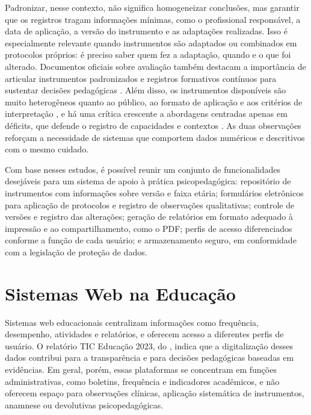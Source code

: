 Padronizar, nesse contexto, não significa homogeneizar conclusões, mas garantir que os registros tragam informações mínimas, como o profissional responsável, a data de aplicação, a versão do instrumento e as adaptações realizadas. Isso é especialmente relevante quando instrumentos são adaptados ou combinados em protocolos próprios: é preciso saber quem fez a adaptação, quando e o que foi alterado. Documentos oficiais sobre avaliação também destacam a importância de articular instrumentos padronizados e registros formativos contínuos para sustentar decisões pedagógicas \cite{mec2021_guia_avaliacao}. Além disso, os instrumentos disponíveis são muito heterogêneos quanto ao público, ao formato de aplicação e aos critérios de interpretação \cite{tavares2022_instrumentos_psicopedagogicos}, e há uma crítica crescente a abordagens centradas apenas em déficits, que defende o registro de capacidades e contextos \cite{Barbosa_2025}. As duas observações reforçam a necessidade de sistemas que comportem dados numéricos e descritivos com o mesmo cuidado.

Com base nesses estudos, é possível reunir um conjunto de funcionalidades desejáveis para um sistema de apoio à prática psicopedagógica: repositório de instrumentos com informações sobre versão e faixa etária; formulários eletrônicos para aplicação de protocolos e registro de observações qualitativas; controle de versões e registro das alterações; geração de relatórios em formato adequado à impressão e ao compartilhamento, como o PDF; perfis de acesso diferenciados conforme a função de cada usuário; e armazenamento seguro, em conformidade com a legislação de proteção de dados.

\section{Sistemas Web na Educação}

Sistemas web educacionais centralizam informações como frequência, desempenho, atividades e relatórios, e oferecem acesso a diferentes perfis de usuário. O relatório TIC Educação 2023, do , indica que a digitalização desses dados contribui para a transparência e para decisões pedagógicas baseadas em evidências. Em geral, porém, essas plataformas se concentram em funções administrativas, como boletins, frequência e indicadores acadêmicos, e não oferecem espaço para observações clínicas, aplicação sistemática de instrumentos, anamnese ou devolutivas psicopedagógicas.

